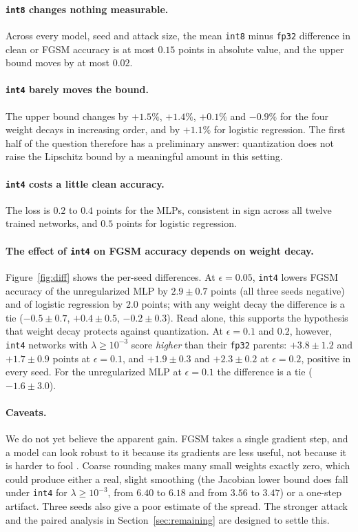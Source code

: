 \documentclass{article}
\newcommand{\fp}{\texttt{fp32}}
\newcommand{\ieight}{\texttt{int8}}
\newcommand{\ifour}{\texttt{int4}}
\begin{document}
\paragraph{\ieight{} changes nothing measurable.} Across every model, seed and attack size, the mean \ieight{} minus \fp{} difference in clean or FGSM accuracy is at most $0.15$ points in absolute value, and the upper bound moves by at most $0.02$.

\paragraph{\ifour{} barely moves the bound.} The upper bound changes by $+1.5\%$, $+1.4\%$, $+0.1\%$ and $-0.9\%$ for the four weight decays in increasing order, and by $+1.1\%$ for logistic regression. The first half of the question therefore has a preliminary answer: quantization does not raise the Lipschitz bound by a meaningful amount in this setting.

\paragraph{\ifour{} costs a little clean accuracy.} The loss is $0.2$ to $0.4$ points for the MLPs, consistent in sign across all twelve trained networks, and $0.5$ points for logistic regression.

\paragraph{The effect of \ifour{} on FGSM accuracy depends on weight decay.} Figure~\ref{fig:diff} shows the per-seed differences. At $\epsilon = 0.05$, \ifour{} lowers FGSM accuracy of the unregularized MLP by $2.9 \pm 0.7$ points (all three seeds negative) and of logistic regression by $2.0$ points; with any weight decay the difference is a tie ($-0.5 \pm 0.7$, $+0.4 \pm 0.5$, $-0.2 \pm 0.3$). Read alone, this supports the hypothesis that weight decay protects against quantization. At $\epsilon = 0.1$ and $0.2$, however, \ifour{} networks with $\lambda \ge 10^{-3}$ score \emph{higher} than their \fp{} parents: $+3.8 \pm 1.2$ and $+1.7 \pm 0.9$ points at $\epsilon = 0.1$, and $+1.9 \pm 0.3$ and $+2.3 \pm 0.2$ at $\epsilon = 0.2$, positive in every seed. For the unregularized MLP at $\epsilon = 0.1$ the difference is a tie ($-1.6 \pm 3.0$).

\paragraph{Caveats.} We do not yet believe the apparent gain. FGSM takes a single gradient step, and a model can look robust to it because its gradients are less useful, not because it is harder to fool \citep{athalye2018obfuscated}. Coarse rounding makes many small weights exactly zero, which could produce either a real, slight smoothing (the Jacobian lower bound does fall under \ifour{} for $\lambda \ge 10^{-3}$, from $6.40$ to $6.18$ and from $3.56$ to $3.47$) or a one-step artifact. Three seeds also give a poor estimate of the spread. The stronger attack and the paired analysis in Section~\ref{sec:remaining} are designed to settle this.
\end{document}
